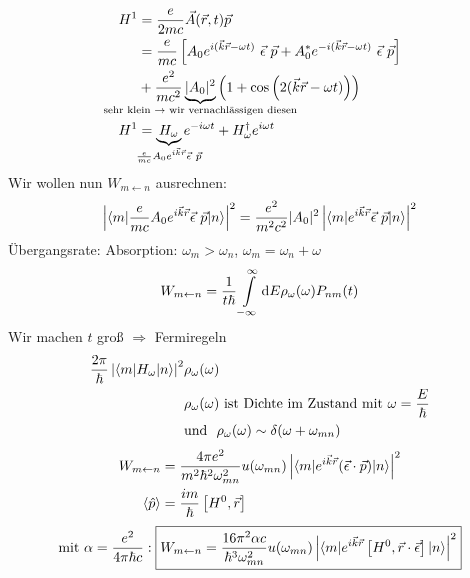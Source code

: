 		\begin{align*}
			H^1 &= \frac{e}{2 m c} \vec{A} (\vec{r} , t) \vec{p} \\
			&= \frac{e}{m c}
			\left[A_0 e^{i(\vec{k} \vec{r} - \omega t)} ~\vec{\epsilon}~\vec{p}
			+ A^*_0 e^{-i(\vec{k} \vec{r} - \omega t)} ~\vec{\epsilon}~\vec{p}
			\right] \\
			&+ \frac{e^2}{m c^2} \underbrace{|A_0|^2}_{\mathclap{\text{sehr klein~} \rightarrow \text{~wir vernachlässigen diesen}}} 
			\left(1 + \cos \left(2 (\vec{k} \vec{r} - \omega t)\right)\right) \\
			H^1 &= \underbrace{H_\omega}_{\mathclap{\frac{e}{m c} A_0 e^{i \vec{k} \vec{r}} \vec{\epsilon}~\vec{p}}} 
			e^{-i \omega t} 
			+ H_\omega^\dagger e^{i \omega t}
		\end{align*}
	Wir wollen nun $W_{m \leftarrow n}$ ausrechnen:
		\begin{align*}
			\left|\braket{m | \frac{e}{m c} A_0 e^{i \vec{k} \vec{r}} \vec{\epsilon}~\vec{p} |n}\right|^2
			= \frac{e^2}{m^2 c^2} |A_0|^2 \left| \braket{m | e^{i \vec{k} \vec{r}} \vec{\epsilon}~\vec{p} | n}\right|^2
		\end{align*}
	Übergangsrate: Absorption: $\omega_m > \omega_n$, $\omega_m = \omega_n + \omega$
		\begin{equation*}
			W_{m \leftarrow n} = 
			\frac{1}{t \hbar} \int \limits_{-\infty}^{\infty} 
			\mathrm{d} E \rho_\omega (\omega) P_{nm} (t)
		\end{equation*}
	Wir machen $t$ groß $\Rightarrow$ Fermiregeln
		\begin{align*}
			\frac{2 \pi}{\hbar} \left|\braket{m | H_\omega | n}\right|^2 &\rho_\omega (\omega) \\
			&\rho_\omega (\omega) \text{~ist Dichte im Zustand mit~} \omega = \frac{E}{\hbar} \\
			&\text{und~ }\rho_\omega (\omega)\sim \delta (\omega + \omega_{mn})
		\end{align*}
		\begin{align*}
			W_{m \leftarrow n} &= 
			\frac{4 \pi e^2}{m^2 \hbar^2 \omega_{mn}^2} u(\omega_{mn}) 
			\left|\braket{m | e^{i \vec{k} \vec{r}} (\vec{\epsilon} \cdot \vec{p}) | n}\right|^2 \\
			\langle {\hat{p}} \rangle &= \frac{i m}{\hbar} \left[H^0 , \vec{r} \right] 
		\end{align*}
		\begin{align*}
			\text{mit~}\alpha = \frac{e^2}{4 \pi \hbar c} :
			\boxed{W_{m \leftarrow n} = \frac{16 \pi^2 \alpha c}{\hbar^3 \omega_{mn}^2} 
				u (\omega_{mn}) \left|\braket{m | e^{i \vec{k} \vec{r}} \left[H^0 , \vec{r} \cdot \vec{\epsilon}\right] | n}\right|^2
			}
		\end{align*}
